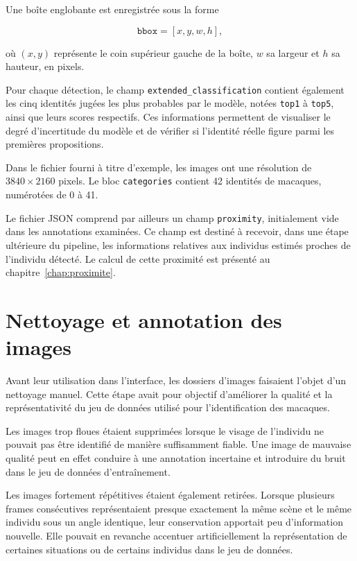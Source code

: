 \documentclass[11pt,a4paper]{report}
\begin{document}
Une boîte englobante est enregistrée sous la forme

\begin{equation}
    \texttt{bbox}=[x,y,w,h],
\end{equation}

où $(x,y)$ représente le coin supérieur gauche de la boîte, $w$ sa largeur et
$h$ sa hauteur, en pixels.

Pour chaque détection, le champ
\texttt{extended\_classification} contient également les cinq identités jugées
les plus probables par le modèle, notées \texttt{top1} à \texttt{top5}, ainsi
que leurs scores respectifs. Ces informations permettent de visualiser le degré
d'incertitude du modèle et de vérifier si l'identité réelle figure parmi les
premières propositions.

Dans le fichier fourni à titre d'exemple, les images ont une résolution de
$3840 \times 2160$ pixels. Le bloc \texttt{categories} contient 42 identités de
macaques, numérotées de 0 à 41.

Le fichier JSON comprend par ailleurs un champ \texttt{proximity}, initialement
vide dans les annotations examinées. Ce champ est destiné à recevoir, dans une
étape ultérieure du pipeline, les informations relatives aux individus estimés
proches de l'individu détecté. Le calcul de cette proximité est présenté au
chapitre~\ref{chap:proximite}.

\section{Nettoyage et annotation des images}

Avant leur utilisation dans l'interface, les dossiers d'images faisaient
l'objet d'un nettoyage manuel. Cette étape avait pour objectif d'améliorer la
qualité et la représentativité du jeu de données utilisé pour l'identification
des macaques.

Les images trop floues étaient supprimées lorsque le visage de l'individu ne
pouvait pas être identifié de manière suffisamment fiable. Une image de mauvaise
qualité peut en effet conduire à une annotation incertaine et introduire du
bruit dans le jeu de données d'entraînement.

Les images fortement répétitives étaient également retirées. Lorsque plusieurs
frames consécutives représentaient presque exactement la même scène et le même
individu sous un angle identique, leur conservation apportait peu d'information
nouvelle. Elle pouvait en revanche accentuer artificiellement la représentation
de certaines situations ou de certains individus dans le jeu de données.
\end{document}
